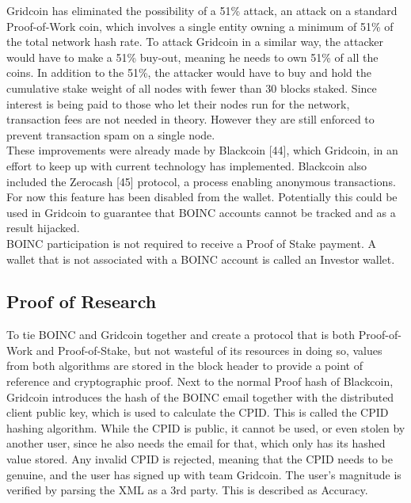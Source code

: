 Gridcoin has eliminated the possibility of a 51\% attack, an attack on a standard Proof-of-Work coin, which involves a single entity owning a minimum of 51\% of the total network hash rate. To attack Gridcoin in a similar way, the attacker would have to make a 51\% buy-out, meaning he needs to own 51\% of all the coins. In addition to the 51\%, the attacker would have to buy and hold the cumulative stake weight of all nodes with fewer than 30 blocks staked. Since interest is being paid to those who let their nodes run for the network, transaction fees are not needed in theory. However they are still enforced to prevent transaction spam on a single node.\\

These improvements were already made by Blackcoin [44], which Gridcoin, in an effort to keep up with current technology has implemented. Blackcoin also included the Zerocash [45] protocol, a process enabling anonymous transactions. For now this feature has been disabled from the wallet. Potentially this could be used in Gridcoin to guarantee that BOINC accounts cannot be tracked and as a result hijacked.\\

BOINC participation is not required to receive a Proof of Stake payment. A wallet that is not associated with a BOINC account is called an Investor wallet.

\subsection{Proof of Research}

To tie BOINC and Gridcoin together and create a protocol that is both Proof-of-Work and Proof-of-Stake, but not wasteful of its resources in doing so, values from both algorithms are stored in the block header to provide a point of reference and cryptographic proof. Next to the normal Proof hash of Blackcoin, Gridcoin introduces the hash of the BOINC email together with the distributed client public key, which is used to calculate the CPID. This is called the CPID hashing algorithm. While the CPID is public, it cannot be used, or even stolen by another user, since he also needs the email for that, which only has its hashed value stored. Any invalid CPID is rejected, meaning that the CPID needs to be genuine, and the user has signed up with team Gridcoin. The user's magnitude is verified by parsing the XML as a 3rd party. This is described as Accuracy.\\

